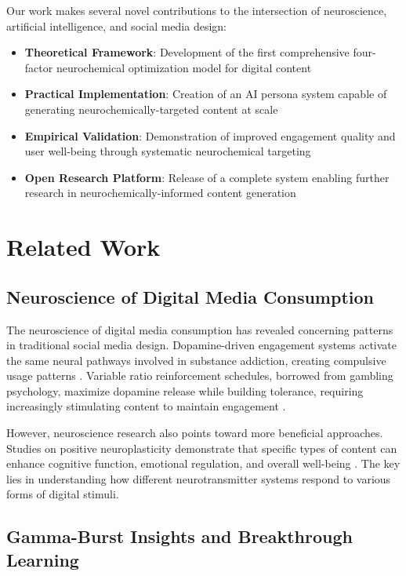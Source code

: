 \documentclass[11pt,letterpaper]{article}
\begin{document}
Our work makes several novel contributions to the intersection of neuroscience, artificial intelligence, and social media design:

\begin{itemize}
    \item \textbf{Theoretical Framework}: Development of the first comprehensive four-factor neurochemical optimization model for digital content
    \item \textbf{Practical Implementation}: Creation of an AI persona system capable of generating neurochemically-targeted content at scale
    \item \textbf{Empirical Validation}: Demonstration of improved engagement quality and user well-being through systematic neurochemical targeting
    \item \textbf{Open Research Platform}: Release of a complete system enabling further research in neurochemically-informed content generation
\end{itemize}

\section{Related Work}

\subsection{Neuroscience of Digital Media Consumption}

The neuroscience of digital media consumption has revealed concerning patterns in traditional social media design. Dopamine-driven engagement systems activate the same neural pathways involved in substance addiction, creating compulsive usage patterns \cite{haynes2018}. Variable ratio reinforcement schedules, borrowed from gambling psychology, maximize dopamine release while building tolerance, requiring increasingly stimulating content to maintain engagement \cite{berridge2016}.

However, neuroscience research also points toward more beneficial approaches. Studies on positive neuroplasticity demonstrate that specific types of content can enhance cognitive function, emotional regulation, and overall well-being \cite{hanson2013}. The key lies in understanding how different neurotransmitter systems respond to various forms of digital stimuli.

\subsection{Gamma-Burst Insights and Breakthrough Learning}
\end{document}
